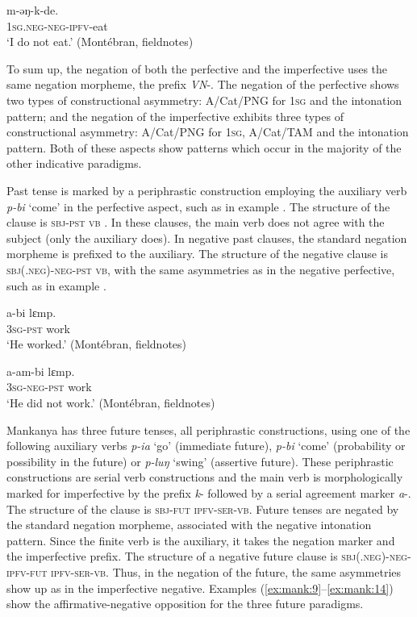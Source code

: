 \documentclass[output=paper,colorlinks,citecolor=brown]{langscibook}
\begin{document}
\ea\label{ex:mank:6}
    \gll  m-əŋ-k-de.\\
         \textsc{1sg.neg-neg-ipfv}-eat\\
    \glt ‘I do not eat.’ (Montébran, fieldnotes)
\z

To sum up, the negation of both the perfective and the imperfective uses the same negation morpheme, the prefix \textit{VN}{}-. The negation of the perfective shows two types of constructional asymmetry: A/Cat/PNG for \textsc{1sg} and the intonation pattern; and the negation of the imperfective exhibits three types of constructional asymmetry: A/Cat/PNG for \textsc{1sg}, A/Cat/TAM and the intonation pattern. Both of these aspects show patterns which occur in the majority of the other indicative paradigms.

Past tense is marked by a periphrastic construction employing the auxiliary verb \textit{p-bi} ‘come’ in the perfective aspect, such as in example . The structure of the clause is \textsc{sbj-pst vb} . In these clauses, the main verb does not agree with the subject (only the auxiliary does). In negative past clauses, the standard negation morpheme is prefixed to the auxiliary. The structure of the negative clause is \textsc{sbj(.neg){}-neg-pst vb}, with the same asymmetries as in the negative perfective, such as in example .

\ea\label{ex:mank:7}
    \gll a-bi lɛmp.\\
         \textsc{3sg-pst} work\\
    \glt ‘He worked.’ (Montébran, fieldnotes)\\
\z

\ea\label{ex:mank:8}
    \gll  a-am-bi lɛmp.\\
         \textsc{3sg{}-neg-pst} work\\
    \glt ‘He did not work.’ (Montébran, fieldnotes)
\z

Mankanya has three future tenses, all periphrastic constructions, using one of the following auxiliary verbs \textit{p-ia} ‘go’ (immediate future), \textit{p-bi} ‘come’ (probability or possibility in the future) or \textit{p-luŋ} ‘swing’ (assertive future). These periphrastic constructions are serial verb constructions and the main verb is morphologically marked for imperfective by the prefix \textit{k}{}- followed by a serial agreement marker \textit{a}{}-. The structure of the clause is \textsc{sbj-fut} \textsc{ipfv-ser-vb}. Future tenses are negated by the standard negation morpheme, associated with the negative intonation pattern. Since the finite verb is the auxiliary, it takes the negation marker and the imperfective prefix. The structure of a negative future clause is \textsc{sbj(.neg){}-neg-ipfv-fut ipfv-ser-vb}. Thus, in the negation of the future, the same asymmetries show up as in the imperfective negative.  Examples (\ref{ex:mank:9}--\ref{ex:mank:14}) show the affirmative-negative opposition for the three future paradigms.
\end{document}
